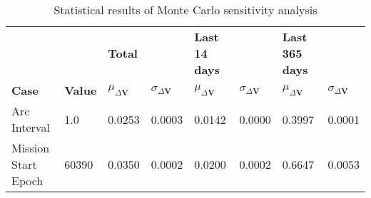\begin{table}[h!]
\centering
\begin{tabular}{lllllll}
 &  & \textbf{Total} &  & \textbf{Last 14 days} & & \textbf{Last 365 days} \\
\textbf{Case} & \textbf{Value} & \textbf{$\mu_{\Delta \boldsymbol{V}}$} & \textbf{$\sigma_{\Delta \boldsymbol{V}}$} & \textbf{$\mu_{\Delta \boldsymbol{V}}$} & \textbf{$\sigma_{\Delta \boldsymbol{V}}$} & \textbf{$\mu_{\Delta \boldsymbol{V}}$} & \textbf{$\sigma_{\Delta \boldsymbol{V}}$} \\ 
Arc Interval & 1.0 & 0.0253 & 0.0003 & 0.0142 & 0.0000 & 0.3997 & 0.0001 \\ 
Mission Start Epoch & 60390 & 0.0350 & 0.0002 & 0.0200 & 0.0002 & 0.6647 & 0.0053 \\ 
\end{tabular}
\caption{Statistical results of Monte Carlo sensitivity analysis}
\label{tab:SensitivityAnalysis}
\end{table}